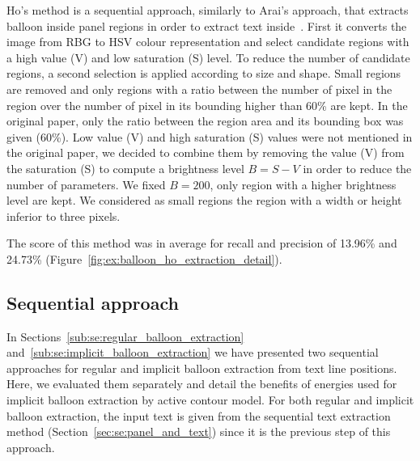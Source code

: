 Ho's method is a sequential approach, similarly to Arai's approach, that extracts balloon inside panel regions in order to extract text inside~\cite{Ho2012}.
First it converts the image from RBG to HSV colour representation and select candidate regions with a high value (V) and low saturation (S) level.
To reduce the number of candidate regions, a second selection is applied according to size and shape.
Small regions are removed and only regions with a ratio between the number of pixel in the region over the number of pixel in its bounding higher than 60\% are kept.
In the original paper, only the ratio between the region area and its bounding box was given (60\%).
Low value (V) and high saturation (S) values were not mentioned in the original paper, we decided to combine them by removing the value (V) from the saturation (S) to compute a brightness level $B=S-V$ in order to reduce the number of parameters.
We fixed $B=200$, only region with a higher brightness level are kept.
We considered as small regions the region with a width or height inferior to three pixels.

The score of this method  was in average for recall and precision of 13.96\% and 24.73\% (Figure~\ref{fig:ex:balloon_ho_extraction_detail}).




\subsection{Sequential approach} %

In Sections~\ref{sub:se:regular_balloon_extraction} and~\ref{sub:se:implicit_balloon_extraction} we have presented two sequential approaches for regular and implicit balloon extraction from text line positions.
Here, we evaluated them separately and detail the benefits of energies used for implicit balloon extraction by active contour model.
For both regular and implicit balloon extraction, the input text is given from the sequential text extraction method (Section~\ref{sec:se:panel_and_text}) since it is the previous step of this approach.

